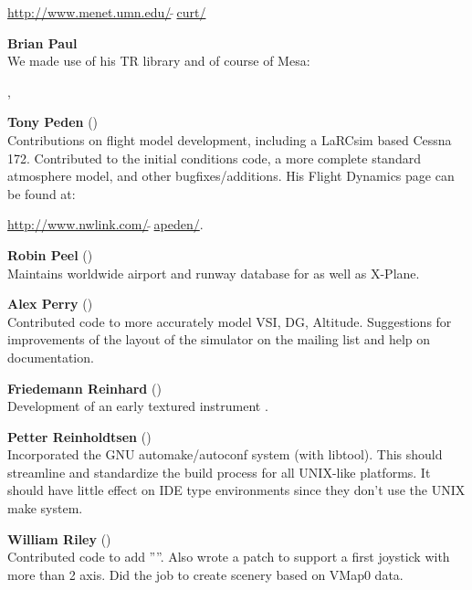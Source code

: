  \href{http://www.menet.umn.edu/~curt/}{http://www.menet.umn.edu/$\tilde{~~}$curt/}
 \medskip
 
\noindent \textbf{Brian Paul}\\
 We made use of his TR library and of course of Mesa:
 
 , 
 \medskip

\noindent \textbf{Tony Peden}  ()\\
  Contributions on flight model development, including a LaRCsim based
  Cessna 172. Contributed to  {\JSBSim} the initial conditions code, a more complete
  standard atmosphere model, and other bugfixes/additions.
  His Flight Dynamics page can be found at:
   \medskip

  \href{http://www.nwlink.com/~apeden}{http://www.nwlink.com/$\tilde{~~}$apeden/}.
  \medskip


\noindent \textbf{Robin Peel} ()\\
  Maintains worldwide airport and runway database for \FlightGear{} as well as X-Plane.
 \medskip

\noindent \textbf{Alex Perry} ()\\
 Contributed code to more accurately model VSI, DG, Altitude.
 Suggestions for improvements of the layout of the simulator on the mailing list
 and help on documentation.
 \medskip

\noindent \textbf{Friedemann Reinhard}
()\\
  Development of an early textured instrument .
 \medskip

\noindent \textbf{Petter Reinholdtsen}
()\\
  Incorporated the GNU automake/autoconf system (with libtool).
  This should streamline and standardize the build process for all
  UNIX-like platforms.  It should have little effect on IDE type
  environments since they don't use the UNIX make system.
 \medskip

\noindent \textbf{William Riley} ()\\
  Contributed code to add ''''. Also wrote a patch to support a first  joystick with more than 2 axis. Did the job to create scenery based on VMap0 data.
 \medskip
 
